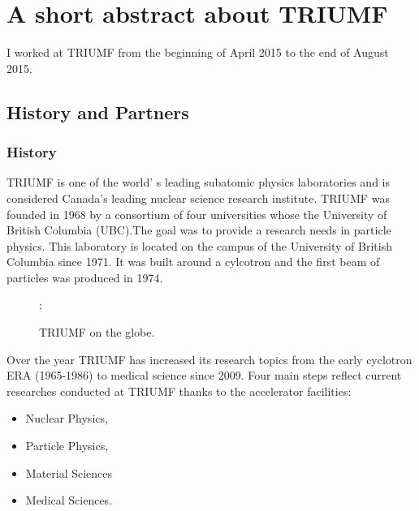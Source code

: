 \documentclass[a4paper, 11pt]{report}%
\newcommand{\TR}{TRIUMF }
\begin{document}
\chapter{A short abstract about \TR}

  I worked at \TR from the beginning of April 2015 to the end of August 2015.
  
  \section{History and Partners}

  \subsection{History}
  
  \TR is one of the world' s leading subatomic physics laboratories and is considered Canada's leading nuclear science research institute. 
  \TR was founded in 1968 by a consortium of four universities whose the University of British Columbia (UBC).The goal was to provide a 
  research needs in particle physics. This laboratory is located on the campus of the University of British Columbia since 1971. 
  It was built around a cylcotron and the first beam of particles was produced in 1974.
  
  \begin{figure}[!hbtp]
  \centering
    
    
    \color{blue};

    \caption{\color{black}\TR on the  globe.}
    \label{fig:\TR_localisation}
  \end{figure}
  
  Over the year \TR has increased its research topics from the early cyclotron ERA (1965-1986) to medical science since 2009. 
  Four main steps reflect current researches conducted at \TR  thanks to the accelerator facilities:
  \begin{itemize}
   \item Nuclear Physics,
   \item Particle Physics,
   \item Material Sciences
   \item Medical Sciences. 
  \end{itemize}
\end{document}
